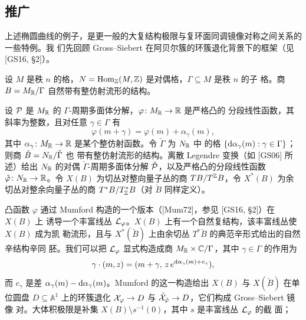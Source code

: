 
\subsection{推广}

上述椭圆曲线的例子，是更一般的大复结构极限与复环面同调镜像对称之间关系的一些特例。我
们先回顾 Gross--Siebert 在阿贝尔簇的环簇退化背景下的框架（见 [GS16, §2]）。

设 $M$ 是秩 $n$ 的格，$N=\operatorname{Hom}_{\mathbb{Z}}(M,\mathbb{Z})$ 是对偶格，$\Gamma\subseteq M$ 是秩 $n$ 的子
格。商 $B=M_{\mathbb{R}}/\Gamma$ 自然带有整仿射流形的结构。

设 $\mathcal{P}$ 是 $M_{\mathbb{R}}$ 的 $\Gamma$-周期多面体分解，$\varphi\colon M_{\mathbb{R}}\to\mathbb{R}$ 是严格凸的
分段线性函数，其斜率为整数，且对任意 $\gamma\in\Gamma$ 有
\[
\varphi(m+\gamma)=\varphi(m)+\alpha_\gamma(m),
\]
其中 $\alpha_\gamma\colon M_{\mathbb{R}}\to\mathbb{R}$ 是某个整仿射函数。令 $\check\Gamma$ 为 $N_{\mathbb{R}}$ 中
的格 $\{\mathrm{d}\alpha_\gamma(m):\gamma\in\Gamma\}$；则商 $\check B=N_{\mathbb{R}}/\check\Gamma$ 也
带有整仿射流形的结构。离散 Legendre 变换（如 [GS06] 所述）给出 $N_{\mathbb{R}}$ 的对偶
$\check\Gamma$-周期多面体分解 $\check{\mathcal{P}}$，以及严格凸的分段线性函数
$\check\varphi\colon N_{\mathbb{R}}\to\mathbb{R}$。令 $X(B)$ 为切丛对整向量子丛的商 $TB/T^{\mathbb{Z}} B$，令
$X^*(B)$ 为余切丛对整余向量子丛的商 $T^*B/T^*_{\mathbb{Z}} B$（对 $\check B$ 同样定义）。


凸函数 $\varphi$ 通过 Mumford 构造的一个版本（[Mum72]，参见 [GS16, §2]）在 $X(B)$ 上
诱导一个丰富线丛 $\mathcal{L}_\varphi$。$X(B)$ 上有一个自然复结构，该丰富线丛使 $X(B)$ 成为凯
勒流形，且与 $X^*(\check B)$ 上由余切丛 $T^*\check B$ 的典范辛形式给出的自然辛结构辛同
胚。我们可以把 $\mathcal{L}_\varphi$ 显式构造成商 $M_{\mathbb{R}}\times\mathbb{C}/\Gamma$，其中
$\gamma\in\Gamma$ 的作用为
\[
\gamma\cdot(m,z)=(m+\gamma,\,z\,e^{\mathrm{d}\alpha_\gamma(m)+c_\gamma}),
\]
而 $c_\gamma$ 是差 $\alpha_\gamma(m)-\mathrm{d}\alpha_\gamma(m)$。Mumford 的这一构造给出
$X(B)$ 与 $X(\check B)$ 在单位圆盘 $D\subseteq\mathbb A^1$ 上的环簇退化
$\mathcal{X}_\varphi\to D$ 与 $\check{\mathcal{X}}_{\check\varphi}\to D$，它们构成 Gross--Siebert 镜像
对。大体积极限是补集 $X(B)\setminus s^{-1}(0)$，其中 $s$ 是丰富线丛 $\mathcal{L}_\varphi$ 的截
面；

